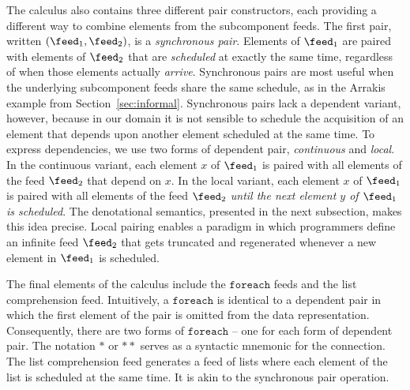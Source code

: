 The calculus also contains three different
pair constructors, each providing a different way to
combine elements from the subcomponent feeds.  The first pair, 
written $(\feed_1, \feed_2)$, is a {\em synchronous pair}.
Elements of $\feed_1$ are paired with elements of $\feed_2$
that are {\em scheduled} at exactly the same time, regardless of when those elements
actually {\em arrive}.  Synchronous pairs are most useful when the underlying
subcomponent feeds share the same schedule, as in the Arrakis example
from Section~\ref{sec:informal}.  Synchronous pairs lack a
dependent variant, however, because in our domain it is not sensible
to schedule the acquisition of an element that depends upon another
element scheduled at the same time.  To express dependencies, we 
use two forms of dependent pair, {\em continuous} and {\em local}.
In the continuous variant, each element $x$ of $\feed_1$ is paired 
with all elements of the feed $\feed_2$ that depend on $x$.  In the
local variant, each element $x$ of $\feed_1$
is paired with all elements of the feed $\feed_2$ {\em until the next
element $y$ of $\feed_1$ is scheduled}.  
The denotational semantics, presented
in the next subsection, makes this idea precise.  Local pairing
enables a paradigm in which programmers define an infinite feed $\feed_2$
that gets truncated and regenerated whenever a new element in $\feed_1$
is scheduled.

The final elements of the calculus include the $\mathtt{foreach}$ feeds
and the list comprehension feed.
Intuitively, a $\mathtt{foreach}$ is identical to a dependent pair in
which the first element of the pair is omitted from the data representation.
Consequently, there are two forms of $\mathtt{foreach}$ -- one for
each form of dependent pair.  The notation ${*}$ or ${**}$ serves as
a syntactic mnemonic for the connection.  The list comprehension
feed generates a feed of lists where each element of the list is
scheduled at the same time.  It is akin to the synchronous pair
operation. 

